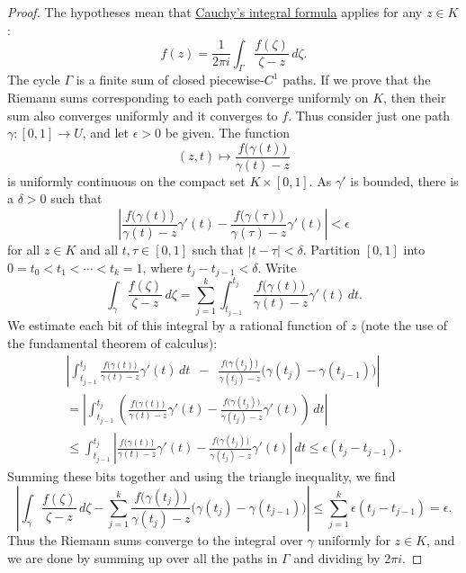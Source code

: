 \documentclass[12pt,openany]{book}
\newcommand{\sabs}[1]{\lvert {#1} \rvert}
\newcommand{\abs}[1]{\left\lvert {#1} \right\rvert}
\theoremstyle{plain}
\theoremstyle{remark}
\theoremstyle{definition}
\theoremstyle{exercise}
\theoremstyle{example}
\begin{document}
\begin{proof}
The hypotheses mean that \hyperref[thm:CIFhomology]{Cauchy's integral formula}
applies for any $z \in K$:
\begin{equation*}
f(z) =
\frac{1}{2\pi i}
\int_\Gamma
\frac{f(\zeta)}{\zeta-z} \, d \zeta .
\end{equation*}
The cycle $\Gamma$ is a finite sum of closed piecewise-$C^1$ paths.
If we prove that the Riemann sums corresponding to each path
converge uniformly on $K$, then their sum also converges uniformly
and it converges to $f$.
Thus consider just one path $\gamma \colon [0,1] \to U$, and
let $\epsilon > 0$ be given.
The function
\begin{equation*}
(z,t) \mapsto
\frac{f\bigl(\gamma(t)\bigr)}{\gamma(t)-z}
\end{equation*}
is uniformly continuous on the compact set $K \times [0,1]$.
As $\gamma'$ is bounded, there is a $\delta > 0$ such that
\begin{equation*}
\abs{
\frac{f\bigl(\gamma(t)\bigr)}{\gamma(t)-z}\gamma'(t)
-
\frac{f\bigl(\gamma(\tau)\bigr)}{\gamma(\tau)-z}\gamma'(t)
} < \epsilon
\end{equation*}
for all $z \in K$ and all $t,\tau \in [0,1]$ such that $\sabs{t-\tau} <
\delta$.
Partition $[0,1]$ into $0 = t_0 < t_1 < \cdots < t_k = 1$, where
$t_j-t_{j-1} < \delta$.
Write
\begin{equation*}
\int_\gamma
\frac{f(\zeta)}{\zeta-z} \, d\zeta
=
\sum_{j=1}^k
\int_{t_{j-1}}^{t_j}
\frac{f\bigl(\gamma(t)\bigr)}{\gamma(t)-z}
\gamma'(t)
\, dt .
\end{equation*}
We estimate each bit of this integral by a rational function
of $z$
(note the use of the fundamental theorem of calculus):
\begin{multline*}
\abs{
\int_{t_{j-1}}^{t_j}
\frac{f\bigl(\gamma(t)\bigr)}{\gamma(t)-z}
\gamma'(t)
\, dt
\enspace
-
\enspace
\frac{f\bigl(\gamma(t_j)\bigr)}{\gamma(t_j)-z}
\bigl( \gamma(t_j)-\gamma(t_{j-1}) \bigr)
}
\\
=
\abs{
\int_{t_{j-1}}^{t_j}
\left(
\frac{f\bigl(\gamma(t)\bigr)}{\gamma(t)-z}
\gamma'(t)
-
\frac{f\bigl(\gamma(t_j)\bigr)}{\gamma(t_j)-z}
\gamma'(t)
\right)
\, dt
}
\\
\leq
\int_{t_{j-1}}^{t_j}
\abs{
\frac{f\bigl(\gamma(t)\bigr)}{\gamma(t)-z}
\gamma'(t)
-
\frac{f\bigl(\gamma(t_j)\bigr)}{\gamma(t_j)-z}
\gamma'(t)
}
\, dt
\leq \epsilon (t_j-t_{j-1}) .
\end{multline*}
Summing these bits together and using the triangle inequality, we find
\begin{equation*}
\abs{
\int_{\gamma} \frac{f(\zeta)}{\zeta-z} \, d\zeta
-
\sum_{j=1}^k
\frac{f\bigl(\gamma(t_j)\bigr)}{\gamma(t_j)-z}
\bigl( \gamma(t_j)-\gamma(t_{j-1}) \bigr)
}
\leq \sum_{j=1}^k \epsilon (t_j-t_{j-1}) = \epsilon .
\end{equation*}
Thus the Riemann sums converge to the integral over $\gamma$ uniformly for $z \in K$, and
we are done by summing up over all the paths in $\Gamma$
and dividing by $2\pi i$.
\end{proof}
\end{document}
